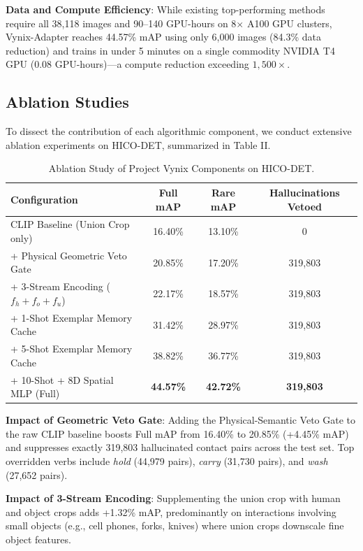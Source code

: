 \documentclass[conference]{IEEEtran}
\begin{document}
\textbf{Data and Compute Efficiency}: While existing top-performing methods require all 38,118 images and 90--140 GPU-hours on 8$\times$ A100 GPU clusters, Vynix-Adapter reaches 44.57\% mAP using only 6,000 images (84.3\% data reduction) and trains in under 5 minutes on a single commodity NVIDIA T4 GPU (0.08 GPU-hours)---a compute reduction exceeding $1,500\times$.

\subsection{Ablation Studies}
To dissect the contribution of each algorithmic component, we conduct extensive ablation experiments on HICO-DET, summarized in Table II.

\begin{table}[h]
\centering
\small
\caption{Ablation Study of Project Vynix Components on HICO-DET.}
\label{tab:ablations}
\begin{tabular}{l c c c}
\toprule
\textbf{Configuration} & \textbf{Full mAP} & \textbf{Rare mAP} & \textbf{Hallucinations Vetoed} \\
\midrule
CLIP Baseline (Union Crop only) & 16.40\% & 13.10\% & 0 \\
+ Physical Geometric Veto Gate & 20.85\% & 17.20\% & 319,803 \\
+ 3-Stream Encoding ($f_h + f_o + f_u$) & 22.17\% & 18.57\% & 319,803 \\
+ 1-Shot Exemplar Memory Cache & 31.42\% & 28.97\% & 319,803 \\
+ 5-Shot Exemplar Memory Cache & 38.82\% & 36.77\% & 319,803 \\
+ 10-Shot + 8D Spatial MLP (Full) & \textbf{44.57\%} & \textbf{42.72\%} & \textbf{319,803} \\
\bottomrule
\end{tabular}
\end{table}

\textbf{Impact of Geometric Veto Gate}: Adding the Physical-Semantic Veto Gate to the raw CLIP baseline boosts Full mAP from 16.40\% to 20.85\% (+4.45\% mAP) and suppresses exactly 319,803 hallucinated contact pairs across the test set. Top overridden verbs include \textit{hold} (44,979 pairs), \textit{carry} (31,730 pairs), and \textit{wash} (27,652 pairs).

\textbf{Impact of 3-Stream Encoding}: Supplementing the union crop with human and object crops adds +1.32\% mAP, predominantly on interactions involving small objects (e.g., cell phones, forks, knives) where union crops downscale fine object features.
\end{document}
